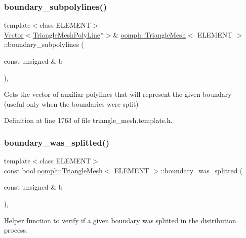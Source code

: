 \subsubsection{\texorpdfstring{boundary\+\_\+subpolylines()}{boundary\_subpolylines()}}
{\footnotesize\ttfamily template$<$class E\+L\+E\+M\+E\+NT$>$ \\
\hyperlink{classoomph_1_1Vector}{Vector}$<$\hyperlink{classoomph_1_1TriangleMeshPolyLine}{Triangle\+Mesh\+Poly\+Line}$\ast$$>$\& \hyperlink{classoomph_1_1TriangleMesh}{oomph\+::\+Triangle\+Mesh}$<$ E\+L\+E\+M\+E\+NT $>$\+::boundary\+\_\+subpolylines (\begin{DoxyParamCaption}\item[{const unsigned \&}]{b }\end{DoxyParamCaption})\hspace{0.3cm}{\ttfamily [inline]}, {\ttfamily [protected]}}



Gets the vector of auxiliar polylines that will represent the given boundary (useful only when the boundaries were split) 



Definition at line 1763 of file triangle\+\_\+mesh.\+template.\+h.

\mbox{\label{classoomph_1_1TriangleMesh_a23272907549db06e9c12ff3a7502d0e0}} 
\subsubsection{\texorpdfstring{boundary\+\_\+was\+\_\+splitted()}{boundary\_was\_splitted()}}
{\footnotesize\ttfamily template$<$class E\+L\+E\+M\+E\+NT$>$ \\
const bool \hyperlink{classoomph_1_1TriangleMesh}{oomph\+::\+Triangle\+Mesh}$<$ E\+L\+E\+M\+E\+NT $>$\+::boundary\+\_\+was\+\_\+splitted (\begin{DoxyParamCaption}\item[{const unsigned \&}]{b }\end{DoxyParamCaption})\hspace{0.3cm}{\ttfamily [inline]}, {\ttfamily [protected]}}



Helper function to verify if a given boundary was splitted in the distribution process. 




